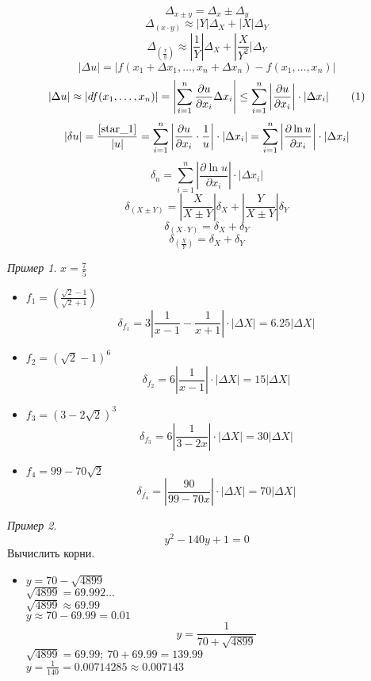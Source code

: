 \documentclass[oneside]{book}
\newcommand\addtag{\refstepcounter{equation}\tag{\theequation}}
\theoremstyle{plain}
\theoremstyle{remark}
\newtheorem*{examp}{Пример}
\theoremstyle{definition}
\begin{document}
\[ \Delta_{x \pm y} = \Delta_x \pm \Delta_y \]
\[ \Delta_{(x\cdot y)} \approx |Y|\Delta_X + |X|\Delta_Y \]
\[ \Delta_{(\frac{x}{y})} \approx \left|\frac{1}{Y}\right|\Delta_X + \left|\frac{X}{Y^2}|\Delta_Y \]
\[ |\Delta u| = |f(x_1 + \Delta x_1, \dots, x_n + \Delta x_n) - f(x_1, \dots, x_n)| \]
\[ |\Delta u| \approx |df(x_1, \dots, x_n)| = \left|\sum_{i=1}^n \frac{\partial u}{\partial x_i}\Delta x_i \right| \le \sum_{i = 1}^n\left|\frac{\partial u}{\partial x_i}\right|\cdot|\Delta x_i| \addtag\label{star_1} \]
\[ |\delta u| = \frac{\ref{star_1}}{|u|} = \sum_{i = 1}^n\left|\frac{\partial u}{\partial x_i}\cdot\frac{1}{u}\right|\cdot|\Delta x_i| = \sum_{i = 1}^n \left|\frac{\partial \ln u}{\partial x_i}\right|\cdot|\Delta x_i| \]
\[ \delta_u = \sum_{i = 1}^n \left|\frac{\partial \ln u}{\partial x_i}\right| \cdot |\Delta x_i| \]
\[ \delta_{(X \pm Y)} = \left|\frac{X}{X \pm Y}\right| \delta_X + \left|\frac{Y}{X \pm Y}\right|\delta_Y \]
\[ \delta_{(X\cdot Y)} = \delta_X + \delta_Y \]
\[ \delta_{(\frac{X}{Y})} = \delta_X + \delta_Y \]

\begin{examp}
\(x = \frac{7}{5}\)
\begin{itemize}
\item \(f_1 = \left(\frac{\sqrt{2} - 1}{\sqrt{2} + 1}\right)\) \\
\[ \delta_{f_1} = 3\left|\frac{1}{x - 1} - \frac{1}{x + 1}\right|\cdot|\Delta X| = 6.25|\Delta X| \]
\item \(f_2 = (\sqrt{2} - 1)^6\) \\
\[ \delta_{f_2} = 6\left|\frac{1}{x - 1}\right|\cdot|\Delta X| = 15|\Delta X| \]
\item \(f_3 = (3 - 2\sqrt{2})^3\)
\[ \delta_{f_3} = 6\left|\frac{1}{3 - 2x}\right|\cdot|\Delta X| = 30|\Delta X| \]
\item \(f_4 = 99 - 70\sqrt{2}\)
\[ \delta_{f_4} = \left|\frac{90}{99 - 70x}\right|\cdot|\Delta X| = 70|\Delta X| \]
\end{itemize}
\end{examp}

\begin{examp}
\[ y^2 - 140y + 1 = 0 \]
Вычислить корни.
\begin{itemize}
\item \(y = 70 - \sqrt{4899}\) \\
\(\sqrt{4899} = 69.992\dots\) \\
\(\sqrt{4899} \approx 69.99\) \\
\(y \approx 70 - 69.99 = 0.01\)
\[ y = \frac{1}{70 + \sqrt{4899}} \]
\(\sqrt{4899} = 69.99;\ 70 + 69.99 = 139.99\) \\
\(y = \frac{1}{140} = 0.00714285 \approx 0.007143\)
\end{itemize}
\end{examp}
\end{document}
